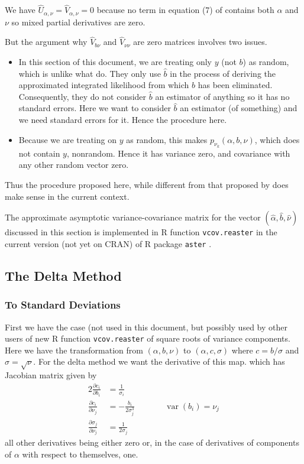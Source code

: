 \documentclass[11pt]{article}
\DeclareMathOperator{\var}{var}
\let\code=\texttt
\begin{document}
We have $\widehat{U}_{\alpha, \nu} = \widehat{V}_{\alpha, \nu} = 0$
because no term in equation (7) of \citet{reaster} contains both $\alpha$
and $\nu$ so mixed partial derivatives are zero.

But the argument why $\widehat{V}_{b \nu}$ and $\widehat{V}_{\nu \nu}$
are zero matrices involves two issues.
\begin{itemize}
\item In this section of this document, we are treating only $y$ (not $b$)
    as random, which is unlike what \citet{reaster} do.  They only use
    $\hat{b}$ in the process of deriving the approximated integrated
    likelihood from which $b$ has been eliminated.  Consequently, they
    do not consider $\hat{b}$ an estimator of anything so it has no
    standard errors.  Here we want to consider $\hat{b}$ an estimator
    (of something) and we need standard errors for it.  Hence the
    procedure here.
\item Because we are treating on $y$ as random, this makes
   $p_{\nu_k}(\alpha, b, \nu)$, which does not contain $y$, nonrandom.
   Hence it has variance zero, and covariance with any other random vector
   zero.
\end{itemize}

Thus the procedure proposed here, while different from that proposed
by \citet{reaster} does make sense in the current context.

The approximate asymptotic variance-covariance matrix for the vector
$(\hat{\alpha}, \hat{b}, \hat{\nu})$ discussed in this section is
implemented in R function \code{vcov.reaster} in
the current version (not yet on CRAN) of R package \code{aster}
\citep{aster-package}.

\subsection{The Delta Method}

\subsubsection{To Standard Deviations}

First we have the case (not used in this document, but possibly used
by other users of new R function \code{vcov.reaster} of square roots
of variance components.  Here we have the transformation from
$(\alpha, b, \nu)$ to $(\alpha, c, \sigma)$ where $c = b / \sigma$
and $\sigma = \sqrt{\nu}$.  For the delta method we want the derivative
of this map. which has Jacobian matrix given by
\begin{alignat*}{2}
   \frac{\partial c_i}{\partial b_i} & = \frac{1}{\sigma_i}
   \\
   \frac{\partial c_i}{\partial \nu_j} & = - \frac{b_i}{2 \sigma_j^3}
   & \qquad & \var(b_i) = \nu_j
   \\
   \frac{\partial \sigma_j}{\partial \nu_j} & = \frac{1}{2 \sigma_j}
\end{alignat*}
all other derivatives being either zero or, in the case of derivatives
of components of $\alpha$ with respect to themselves, one.
\end{document}
